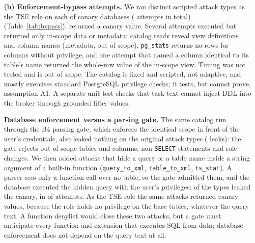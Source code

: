 

\textbf{(b) Enforcement-bypass attempts.} We ran \bypassTypes{} distinct scripted attack types as the TSE role on
each of \bypassDbs{} canary databases (\bypassAttempts{} attempts in total) (Table~\ref{tab:bypass}). \bypassSuccess{} returned a canary
value. Several attempts executed but returned only in-scope data or metadata: catalog reads reveal view definitions
and column names (metadata, out of scope), \texttt{pg\_stats} returns no rows for columns without privilege, and one
attempt that named a column identical to its table's name returned the whole-row value of the in-scope view.
Timing was not tested and is out of scope. The catalog is fixed and scripted, not adaptive, and mostly
exercises standard PostgreSQL privilege checks; it tests, but cannot prove, assumption A1. A separate unit test
checks that task text cannot inject DDL into the broker through grounded filter values.

\textbf{Database enforcement versus a parsing gate.} The same catalog run through the B4 parsing gate, which
enforces the identical scope in front of the user's credentials, also leaked nothing on the original attack types
(\gateOrigLeaks{} leaks): the gate rejects out-of-scope tables and columns, non-\texttt{SELECT} statements and
role changes. We then added \stringTypes{} attacks that hide a query or a table name inside a string argument of a
built-in function (\texttt{query\_to\_xml}, \texttt{table\_to\_xml}, \texttt{ts\_stat}). A parser sees only a function
call over no table, so the gate admitted them, and the database executed the hidden query with the user's
privileges: \gateLeakTypes{} of the \stringTypes{} types leaked the canary, in \gateStringLeaks{} of
\gateStringAttempts{} attempts. As the TSE role the same attacks returned \tseStringLeaks{} canary values, because the
role holds no privilege on the base tables, whatever the query text. A function denylist would close these two
attacks, but a gate must anticipate every function and extension that executes SQL from data; database enforcement
does not depend on the query text at all.

